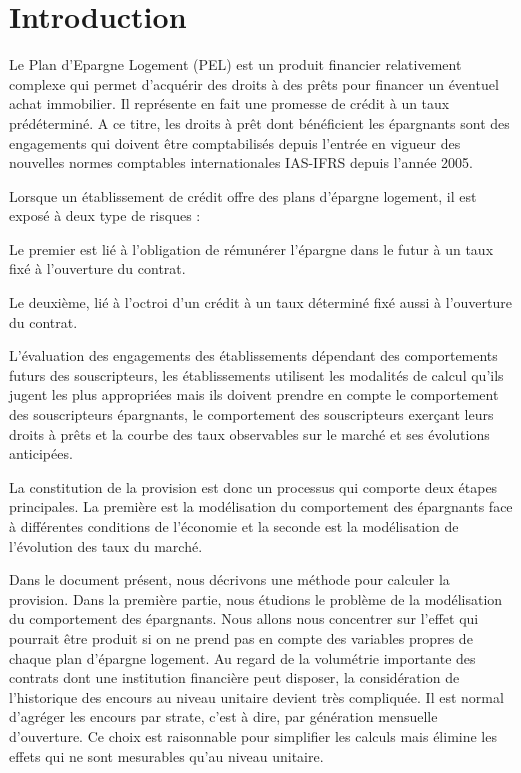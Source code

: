 \documentclass[12pt, a4paper]{book}
\begin{document}
\tableofcontents

\newpage
\section{Introduction}
Le Plan d'Epargne Logement (PEL) est un produit financier relativement complexe qui permet d'acquérir des droits à des prêts pour financer un éventuel achat immobilier.  Il représente en fait une promesse de crédit à un taux prédéterminé. A ce titre, les droits à prêt dont bénéficient les épargnants sont des engagements qui doivent être comptabilisés depuis l'entrée en vigueur des nouvelles normes comptables internationales IAS-IFRS depuis l'année 2005.

Lorsque un établissement de crédit offre des plans d'épargne logement, il est exposé à deux type de risques :

Le premier est lié à l'obligation de rémunérer l'épargne dans le futur à un taux fixé à l'ouverture du contrat.

Le deuxième, lié à l'octroi d'un crédit à un taux déterminé fixé aussi à l'ouverture du contrat.

L'évaluation des engagements des établissements dépendant des comportements futurs des souscripteurs, les établissements utilisent les modalités de calcul qu’ils jugent les plus appropriées mais ils doivent prendre en compte le comportement des souscripteurs épargnants, le comportement des souscripteurs exerçant leurs droits à prêts et la courbe des taux observables sur le marché et ses évolutions anticipées.
 
La constitution de la provision est donc un processus qui comporte deux étapes principales. La première est la modélisation du comportement des épargnants face à différentes conditions de l'économie et la seconde est la modélisation de l'évolution des taux du marché.

Dans le document présent, nous décrivons une méthode pour calculer la provision. Dans la première partie, nous étudions le problème de la modélisation du comportement des épargnants. Nous allons nous concentrer sur l'effet qui pourrait être produit si on ne prend pas en compte des variables propres de chaque plan d'épargne logement. Au regard de la volumétrie importante des contrats dont une institution financière peut disposer, la considération de l'historique des encours au niveau unitaire devient très compliquée. Il est normal d'agréger les encours par strate, c'est à dire, par génération mensuelle d'ouverture. Ce choix est raisonnable pour simplifier les calculs mais élimine les effets qui ne sont mesurables qu'au niveau unitaire. 
\end{document}

